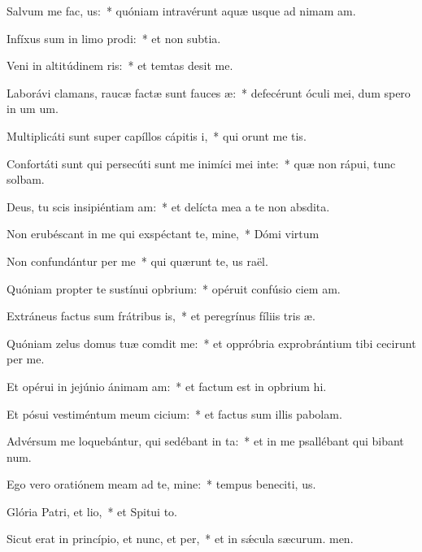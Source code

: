 \item Salvum me fac, us:~* quóniam intravérunt aquæ usque ad nimam am.
\item Infíxus sum in limo prodi:~* et non  subtia.
\item Veni in altitúdinem ris:~* et temtas desit me.
\item Laborávi clamans, raucæ factæ sunt fauces æ:~* defecérunt óculi mei, dum spero in um um.
\item Multiplicáti sunt super capíllos cápitis i,~* qui orunt me tis.
\item Confortáti sunt qui persecúti sunt me inimíci mei inte:~* quæ non rápui, tunc solbam.
\item Deus, tu scis insipiéntiam am:~* et delícta mea a te non  absdita.
\item Non erubéscant in me qui exspéctant te, mine,~* Dómi virtum
\item Non confundántur per me~* qui quærunt te, us raël.
\item Quóniam propter te sustínui opbrium:~* opéruit confúsio ciem am.
\item Extráneus factus sum frátribus is,~* et peregrínus fíliis tris æ.
\item Quóniam zelus domus tuæ comdit me:~* et oppróbria exprobrántium tibi cecirunt per me.
\item Et opérui in jejúnio ánimam am:~* et factum est in opbrium hi.
\item Et pósui vestiméntum meum cicium:~* et factus sum illis  pabolam.
\item Advérsum me loquebántur, qui sedébant in ta:~* et in me psallébant qui bibant num.
\item Ego vero oratiónem meam ad te, mine:~* tempus beneciti, us.
\item Glória Patri, et lio,~* et Spitui to.
\item Sicut erat in princípio, et nunc, et per,~* et in sǽcula sæcurum. men.
